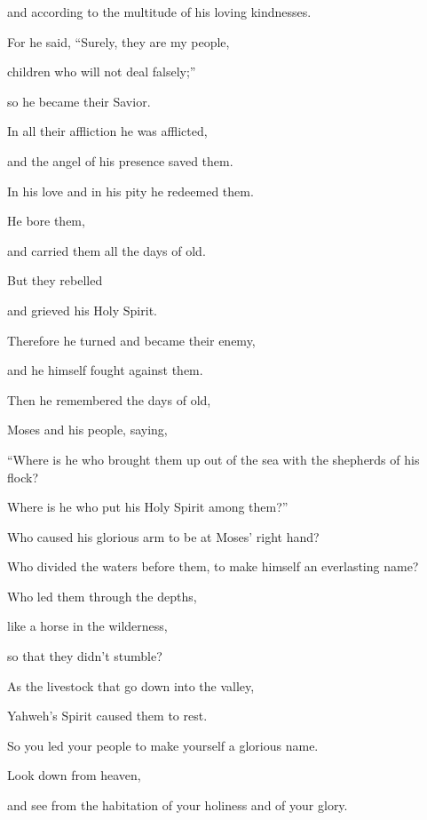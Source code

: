 {\par }{\QB and according to the multitude of his loving kindnesses.
\par }{\Q {}For he said, “Surely, they are my people,
\par }{\QB children who will not deal falsely;”
\par }{\QB so he became their Savior.
\par }{\Q {}In all their affliction he was afflicted,
\par }{\QB and the angel of his presence saved them.
\par }{\Q In his love and in his pity he redeemed them.
\par }{\QB He bore them,
\par }{\QB and carried them all the days of old.
\par }{\BB \par }{\Q {}But they rebelled
\par }{\QB and grieved his Holy Spirit.
\par }{\Q Therefore he turned and became their enemy,
\par }{\QB and he himself fought against them.
\par }{\BB \par }{\Q {}Then he remembered the days of old,
\par }{\QB Moses and his people, saying,
\par }{\Q “Where is he who brought them up out of the sea with the shepherds of his flock?
\par }{\QB Where is he who put his Holy Spirit among them?”
\par }{\Q {}Who caused his glorious arm to be at Moses’ right hand?
\par }{\QB Who divided the waters before them, to make himself an everlasting name?
\par }{\Q {}Who led them through the depths,
\par }{\QB like a horse in the wilderness,
\par }{\QB so that they didn’t stumble?
\par }{\Q {}As the livestock that go down into the valley,
\par }{\QB Yahweh’s Spirit caused them to rest.
\par }{\QB So you led your people to make yourself a glorious name.
\par }{\BB \par }{\Q {}Look down from heaven,
\par }{\QB and see from the habitation of your holiness and of your glory.
}
